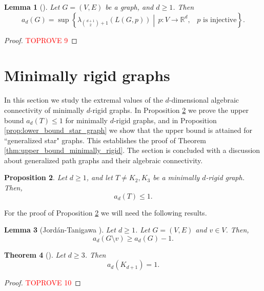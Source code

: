 \documentclass[a4paper,11pt]{article}
\theoremstyle{plain}
\newtheorem{theorem}{\bf Theorem}[section]
\newtheorem{proposition}[theorem]{\bf Proposition}
\newtheorem{lemma}[theorem]{\bf Lemma}
\theoremstyle{definition}
\newcommand{\Rea}{{\mathbb R}}
\begin{document}
\begin{lemma}[{\cite[Lemma 2.4]{lew2022d}}]\label{lemma:a_d_equivalent}
Let $G=(V,E)$ be a graph, and $d\geq 1$. Then
\[
a_d(G)=\sup\left\{ \lambda_{\binom{d+1}{2}+1}(L(G,p)) \middle| \, p: V\to \Rea^d, \, \text{ $p$ is injective} \right\}.
\]
\end{lemma}

\begin{proof}\textcolor{red}{TOPROVE 9}\end{proof}



\section{Minimally rigid graphs}\label{sec:minimally_rigid}

In this section we study the extremal values of the $d$-dimensional algebraic connectivity of minimally $d$-rigid graphs.   In Proposition \ref{prop:upper_bound_minimmaly_rigid} we prove the upper bound $a_d(T)\leq 1$ for minimally $d$-rigid graphs, and in 
Proposition \ref{prop:lower_bound_star_graph} we show that the upper bound is attained for ``generalized star" graphs. This establishes the proof of Theorem \ref{thm:upper_bound_minimally_rigid}. The section is concluded with a discussion about generalized path graphs and their algebraic connectivity.

\begin{proposition}\label{prop:upper_bound_minimmaly_rigid}
Let $d\geq 1$, and let $T\neq K_2, K_3$ be a minimally $d$-rigid graph. Then,
\[
    a_d(T)\leq 1.
\]
\end{proposition}

For the proof of Proposition \ref{prop:upper_bound_minimmaly_rigid} we will need the following results.

\begin{lemma}[Jord\'an-Tanigawa {\cite[Lemma 4.5]{jordan2022rigidity}}]\label{lemma:vertex_removal}
Let $d\geq 1$. Let $G=(V,E)$ and $v\in V$. Then,
\[
    a_d(G\setminus v)\geq a_d(G)-1.
\]
\end{lemma}

\begin{theorem}[{\cite[Theorem 1.2]{lew2022d}}]\label{thm:simplex}
Let $d\geq 3$. Then
\[
    a_d(K_{d+1})=1.
\]
\end{theorem}




\begin{proof}\textcolor{red}{TOPROVE 10}\end{proof}
\end{document}
